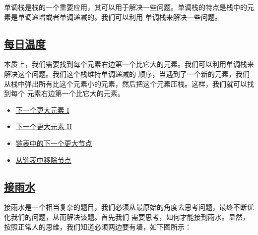 \documentclass[../../main.tex]{subfiles}
\begin{document}
单调栈是栈的一个重要应用，其可以用于解决一些问题。单调栈的特点是栈中的元素是单调递增或者单调递减的。我们可以利用
单调栈来解决一些问题。

\subsection{\href{https://leetcode.cn/problems/daily-temperatures/}{每日温度}}

本质上，我们需要找到每个元素右边第一个比它大的元素。我们可以利用单调栈来解决这个问题。我们这个栈维持单调递减的
顺序，当遇到了一个新的元素，我们从栈中弹出所有比这个元素小的元素，然后把这个元素压栈。这样，我们就可以找到每个
元素右边第一个比它大的元素。



\begin{kaobox}[title=类似题目]
  \begin{itemize}
    \item \href{https://leetcode-cn.com/problems/next-greater-element-i/}{下一个更大元素 I}
    \item \href{https://leetcode-cn.com/problems/next-greater-element-ii/}{下一个更大元素 II}
    \item \href{https://leetcode-cn.com/problems/next-greater-node-in-linked-list/}{链表中的下一个更大节点}
    \item \href{https://leetcode.cn/problems/remove-nodes-from-linked-list/}{从链表中移除节点}
  \end{itemize}
\end{kaobox}

\subsection{\href{https://leetcode.cn/problems/trapping-rain-water/}{接雨水}}

接雨水是一个相当复杂的题目，我们必须从最原始的角度去思考问题，最终不断优化我们的问题，从而解决该题。首先我们
需要思考，如何才能接到雨水。显然，按照正常人的思维，我们知道必须两边要有墙，如下图所示：
\end{document}
